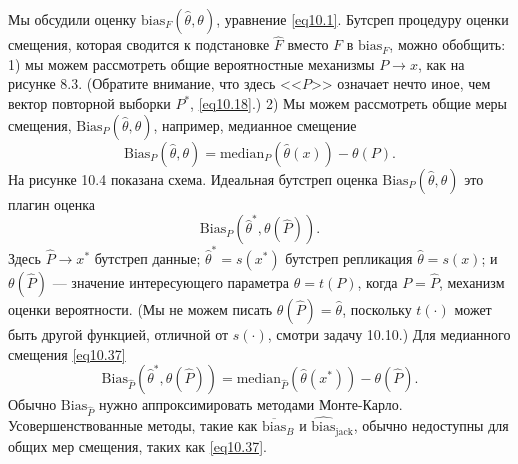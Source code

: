 Мы обсудили оценку $\text{bias}_{F}(\hat{\theta}, \theta)$, уравнение \ref{eq10.1}. Бутсреп процедуру оценки смещения, которая сводится к подстановке $\hat{F}$ вместо $F$ в $\text{bias}_{F}$, можно обобщить: 1) мы можем рассмотреть общие вероятностные механизмы $P \rightarrow x$, как на рисунке 8.3. (Обратите внимание, что здесь <<$P$>> означает нечто иное, чем вектор повторной выборки $P^{*}$, \ref{eq10.18}.) 2) Мы можем рассмотреть общие меры смещения, $\text{Bias}_{P}(\hat{\theta}, \theta)$, например, медианное смещение
\begin{equation}\label{eq10.37}
   \text{Bias}_{P}(\hat{\theta}, \theta) = \text{median}_{P}(\hat{\theta}(x)) - \theta(P).
\end{equation}
На рисунке 10.4 показана схема. Идеальная бутстреп оценка $\text{Bias}_{P}(\hat{\theta}, \theta)$ это плагин оценка
\begin{equation}\label{eq10.38}
   \text{Bias}_{P}(\hat{\theta}^{*}, \theta(\hat{P})).
\end{equation}
Здесь $\hat{P} \rightarrow x^{*}$ бутстреп данные; $\hat{\theta}^{*} = s(x^{*})$ бутстреп репликация $\hat{\theta} = s(x)$; и $\theta(\hat{P})$ --- значение интересующего параметра $\theta = t(P)$, когда $P=\hat{P}$, механизм оценки вероятности. (Мы не можем писать $\theta(\hat{P}) = \hat{\theta}$, поскольку $t(\cdot)$ может быть другой функцией, отличной от $s(\cdot)$, смотри задачу 10.10.) Для медианного смещения \ref{eq10.37}
\begin{equation}\label{eq10.39}
   \text{Bias}_{\hat{P}}(\hat{\theta}^{*}, \theta(\hat{P})) = \text{median}_{\hat{P}}(\hat{\theta}(x^{*})) - \theta(\hat{P}).
\end{equation}
Обычно $\text{Bias}_{\hat{P}}$ нужно аппроксимировать методами Монте-Карло. Усовершенствованные методы, такие как $\overline{\text{bias}}_{B}$ и $\widehat{\text{bias}}_{\text{jack}}$, обычно недоступны для общих мер смещения, таких как \ref{eq10.37}.